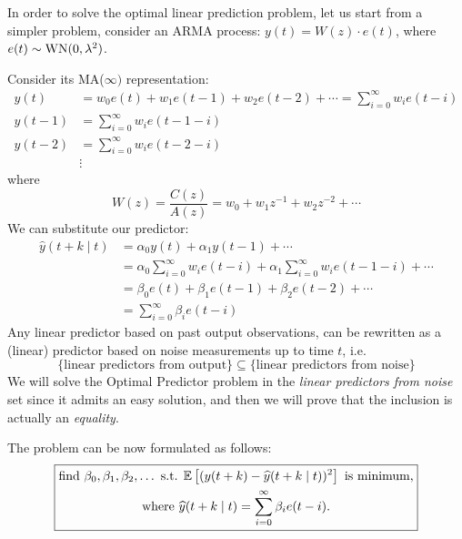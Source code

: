 
In order to solve the optimal linear prediction problem, let us start from a simpler problem, consider an ARMA process: $y(t)=W(z) \cdot e(t)$, where $e(t) \sim \operatorname{WN}(0, \lambda^{2})$.

Consider its MA($\infty)$ representation:
\begin{align*}
	y(t)&=w_{0} e(t)+w_{1} e(t-1)+w_{2} e(t-2)+\cdots=\sum_{i=0}^{\infty} w_{i} e(t-i)\\
	y(t-1)&=\sum_{i=0}^{\infty} w_{i} e(t-1-i)\\
	y(t-2)&=\sum_{i=0}^{\infty} w_{i} e(t-2-i)\\
	&\vdots
\end{align*}
where
\[
	W(z)=\frac{C(z)}{A(z)}=w_{0}+w_{1} z^{-1}+w_{2} z^{-2}+\cdots
\]
We can substitute our predictor:
\begin{align*}
	\hat{y}(t+k \mid t) &=\alpha_{0} y(t)+\alpha_{1} y(t-1)+\cdots \\
	&=\alpha_{0} \sum_{i=0}^{\infty} w_{i} e(t-i)+\alpha_{1} \sum_{i=0}^{\infty} w_{i} e(t-1-i)+\cdots \\
	&=\beta_{0} e(t)+\beta_{1} e(t-1)+\beta_{2} e(t-2)+\cdots\\
	&=\sum_{i=0}^{\infty} \beta_{i} e(t-i)
\end{align*}
Any linear predictor based on past output observations, can be rewritten as a (linear) predictor based on noise measurements up to time $t$, i.e.
\[
	\{\text{linear predictors from output}\} \subseteq \{\text{linear predictors from noise}\}
\]
We will solve the Optimal Predictor problem in the \emph{linear predictors from noise} set since it admits an easy solution, and then we will prove that the inclusion is actually an \emph{equality}.

The problem can be now formulated as follows:
\[
\boxed{
	\begin{gathered}
		\text{find } \beta_{0}, \beta_{1}, \beta_{2}, \ldots \text{ s.t. } \mathbb{E}\left[(y(t+k)-\widehat{y}(t+k \mid t))^{2}\right] \text{ is minimum,}\\
		\text{where } \widehat{y}(t+k \mid t) = \sum_{i=0}^{\infty} \beta_{i} e(t-i).
	\end{gathered}
	}
\]

